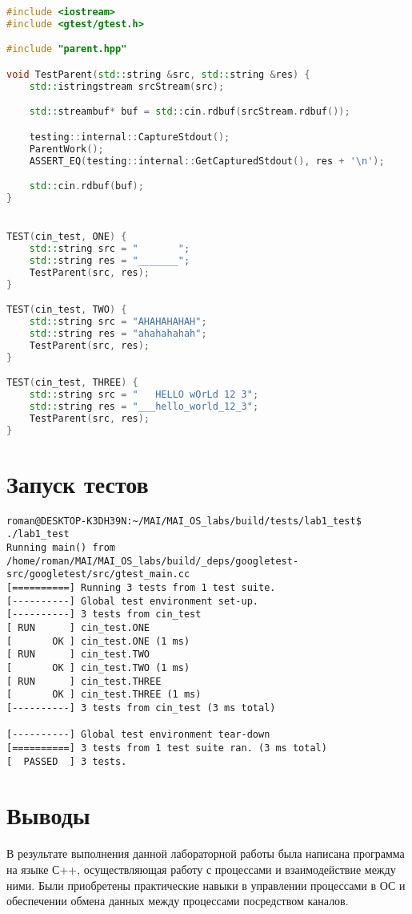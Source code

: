 \documentclass[a4paper, 12pt]{article}
\begin{document}
\begin{lstlisting}[language=C++]
#include <iostream>
#include <gtest/gtest.h>

#include "parent.hpp"

void TestParent(std::string &src, std::string &res) {
    std::istringstream srcStream(src);

    std::streambuf* buf = std::cin.rdbuf(srcStream.rdbuf());

    testing::internal::CaptureStdout();
    ParentWork(); 
    ASSERT_EQ(testing::internal::GetCapturedStdout(), res + '\n'); 

    std::cin.rdbuf(buf);
}


TEST(cin_test, ONE) {
    std::string src = "       ";
    std::string res = "_______";
    TestParent(src, res);
}

TEST(cin_test, TWO) {
    std::string src = "AHAHAHAHAH";
    std::string res = "ahahahahah";
    TestParent(src, res);
}

TEST(cin_test, THREE) {
    std::string src = "   HELLO wOrLd 12 3";
    std::string res = "___hello_world_12_3";
    TestParent(src, res);
}

\end{lstlisting}

\newpage
\section{Запуск тестов}
\begin{verbatim}
roman@DESKTOP-K3DH39N:~/MAI/MAI_OS_labs/build/tests/lab1_test$ ./lab1_test 
Running main() from /home/roman/MAI/MAI_OS_labs/build/_deps/googletest-src/googletest/src/gtest_main.cc
[==========] Running 3 tests from 1 test suite.
[----------] Global test environment set-up.
[----------] 3 tests from cin_test
[ RUN      ] cin_test.ONE
[       OK ] cin_test.ONE (1 ms)
[ RUN      ] cin_test.TWO
[       OK ] cin_test.TWO (1 ms)
[ RUN      ] cin_test.THREE
[       OK ] cin_test.THREE (1 ms)
[----------] 3 tests from cin_test (3 ms total)

[----------] Global test environment tear-down
[==========] 3 tests from 1 test suite ran. (3 ms total)
[  PASSED  ] 3 tests.
\end{verbatim}
\newpage
\section{Выводы}

В результате выполнения данной лабораторной работы была написана программа на языке С++, осуществляющая работу с процессами и 
взаимодействие между ними. Были приобретены практические навыки в управлении процессами в ОС и обеспечении обмена данных между процессами посредством каналов.
\end{document}
